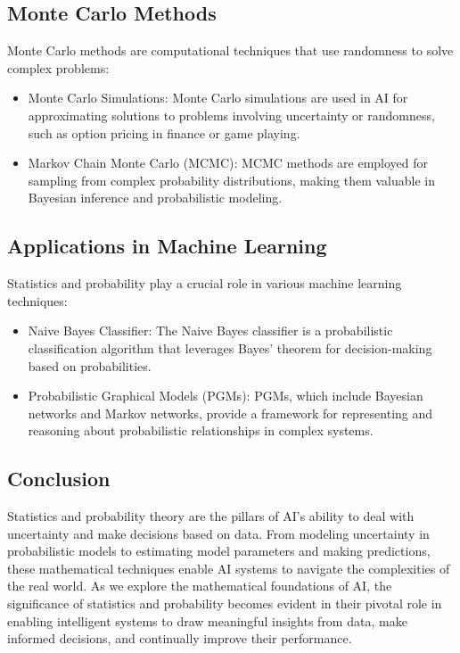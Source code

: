 \documentclass[conference]{IEEEtran}
\begin{document}
\subsection{Monte Carlo Methods}

Monte Carlo methods are computational techniques that use randomness to solve complex problems:
\begin{itemize}
  \item Monte Carlo Simulations: Monte Carlo simulations are used in AI for approximating solutions to problems involving uncertainty or randomness, such as option pricing in finance or game playing.

  \item Markov Chain Monte Carlo (MCMC): MCMC methods are employed for sampling from complex probability distributions, making them valuable in Bayesian inference and probabilistic modeling.
\end{itemize}

\subsection{Applications in Machine Learning}

Statistics and probability play a crucial role in various machine learning techniques:
\begin{itemize}
  \item Naive Bayes Classifier: The Naive Bayes classifier is a probabilistic classification algorithm that leverages Bayes' theorem for decision-making based on probabilities.

  \item Probabilistic Graphical Models (PGMs): PGMs, which include Bayesian networks and Markov networks, provide a framework for representing and reasoning about probabilistic relationships in complex systems.
\end{itemize}

\subsection{Conclusion}

Statistics and probability theory are the pillars of AI's ability to deal with uncertainty and make decisions based on data. From modeling uncertainty in probabilistic models to estimating model parameters and making predictions, these mathematical techniques enable AI systems to navigate the complexities of the real world. As we explore the mathematical foundations of AI, the significance of statistics and probability becomes evident in their pivotal role in enabling intelligent systems to draw meaningful insights from data, make informed decisions, and continually improve their performance.
\end{document}
